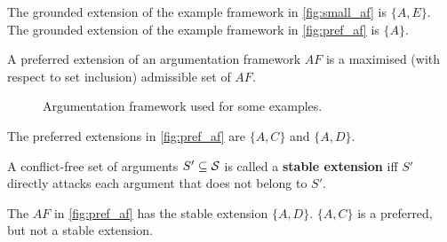 \begin{exa}
	The grounded extension of the example framework in \autoref{fig:small_af} is $\{A, E\}$.
	The grounded extension of the example framework in \autoref{fig:pref_af} is $\{A\}$.
\end{exa}


\begin{definition}
\label{def:preferred_extension}
A preferred extension of an argumentation framework $AF$ is a maximised (with respect to set inclusion) admissible set of $AF$.
\end{definition}

\begin{figure}[!htb]
\centering
{}
\caption{Argumentation framework used for some examples. }
\label{fig:pref_af}
\end{figure}

\begin{exa}
The preferred extensions in \autoref{fig:pref_af} are $\{A, C\}$ and $\{A, D\}$.
\end{exa}

\begin{definition}
A conflict-free set of arguments $S' \subseteq \S$ is called a \textbf{stable extension} iff $S'$ directly attacks each argument that does not belong to $S'$.
\end{definition}
\begin{exa}
The $AF$ in \autoref{fig:pref_af} has the stable extension $\{A, D\}$. $\{A, C\}$ is a preferred, but not a stable extension.
\end{exa}


